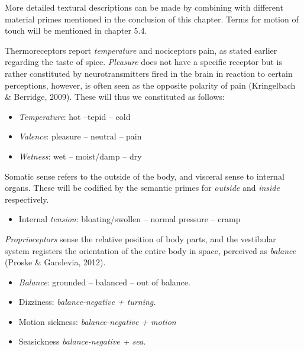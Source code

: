 More detailed textural descriptions can be made by combining with different material primes mentioned in the conclusion of this chapter. Terms for motion of touch will be mentioned in chapter 5.4.  

Thermoreceptors report \textit{temperature} and nociceptors pain, as stated earlier regarding the taste of spice. \textit{Pleasure} does not have a specific receptor but is rather constituted by neurotransmitters fired in the brain in reaction to certain perceptions, however, is often seen as the opposite polarity of pain (Kringelbach \& Berridge, 2009). These will thus we constituted as follows:  


\begin{itemize}
\item   \textit{Temperature}: hot –tepid – cold  

\item   \textit{Valence}: pleasure – neutral – pain  

\item   \textit{Wetness}: wet – moist/damp – dry 
\end{itemize}

Somatic sense refers to the outside of the body, and visceral sense to internal organs. These will be codified by the semantic primes for \textit{outside} and \textit{inside} respectively.   

\begin{itemize}
	\item Internal \textit{tension}: bloating/swollen – normal pressure – cramp  
\end{itemize}

{\it Proprioceptors} sense the relative position of body parts, and the vestibular system registers the orientation of the entire body in space, perceived as \textit{balance} (Proske \& Gandevia, 2012).  

\begin{itemize}
	\item \textit{Balance}: grounded – balanced – out of balance.  

	\item Dizziness: \textit{balance-negative + turning.} 

	\item Motion sickness:  \textit{ balance-negative + motion } 

	\item Seasickness \textit{balance-negative + sea.} 
\end{itemize}


